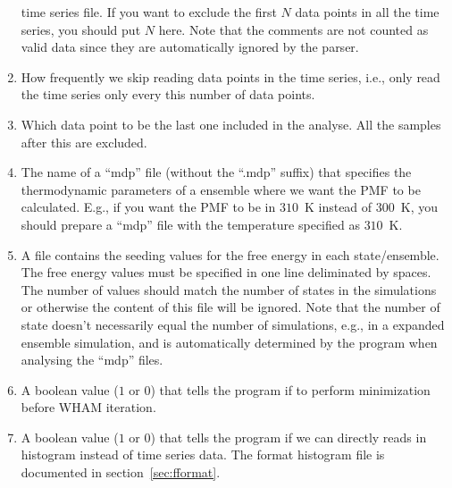 \begin{enumerate}
  time series file.  If you want to exclude the first $N$ data points in all
  the time series, you should put $N$ here. Note that the comments are not
  counted as valid data since they are automatically ignored by the parser.
  \item How frequently we skip reading data points in the time series, i.e.,
  only read the time series only every this number of data points.
  \item Which data point to be the last one included in the analyse. All the 
  samples after this are excluded.
  \item The name of a ``mdp'' file (without the ``.mdp'' suffix) that specifies 
  the thermodynamic parameters of a ensemble where we want the PMF to be calculated.
  E.g., if you want the PMF to be in $310$~K instead of $300$~K, you should prepare
  a ``mdp'' file with the temperature specified as $310$~K.
  \item A file contains the seeding values for the free energy in each state/ensemble.
  The free energy values must be specified in one line deliminated by spaces. 
  The number of values should match the number of states in the simulations or otherwise
  the content of this file will be ignored. Note that the number of state doesn't 
  necessarily equal the number of simulations, e.g., in a expanded ensemble simulation, 
  and is automatically determined by the program when analysing the ``mdp'' files.
  \item A boolean value ($1$ or $0$) that tells the program if to perform
  minimization before WHAM iteration.
  \item A boolean value ($1$ or $0$) that tells the program if we can directly reads 
  in histogram instead of time series data. The format histogram file is documented in 
  section~\ref{sec:fformat}.
\end{enumerate}

